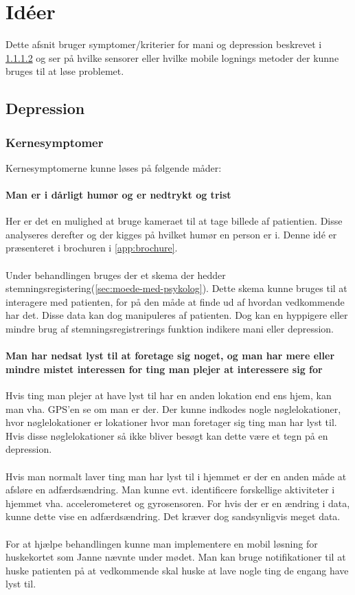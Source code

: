 \section{Idéer}
Dette afsnit bruger symptomer/kriterier for mani og depression beskrevet i \cref{} og ser på hvilke sensorer eller hvilke mobile lognings metoder der kunne bruges til at løse problemet.

\subsection{Depression}

\subsubsection{Kernesymptomer}
Kernesymptomerne kunne løses på følgende måder:

\paragraph{Man er i dårligt humør og er nedtrykt og trist}
Her er det en mulighed at bruge kameraet til at tage billede af patientien. Disse analyseres derefter og der kigges på hvilket humør en person er i. Denne idé er præsenteret i brochuren i \cref{app:brochure}.
\\
\\
Under behandlingen bruges der et skema der hedder stemningsregistering(\cref{sec:moede-med-psykolog}). Dette skema kunne bruges til at interagere med patienten, for på den måde at finde ud af hvordan vedkommende har det. Disse data kan dog manipuleres af patienten. Dog kan en hyppigere eller mindre brug af stemningsregistrerings funktion indikere mani eller depression.
\paragraph{Man har nedsat lyst til at foretage sig noget, og man har mere eller mindre mistet interessen for ting man plejer at interessere sig for}
Hvis ting man plejer at have lyst til har en anden lokation end ens hjem, kan man vha. GPS'en se om man er der. Der kunne indkodes nogle nøglelokationer, hvor nøglelokationer er lokationer hvor man foretager sig ting man har lyst til.
Hvis disse nøglelokationer så ikke bliver besøgt kan dette være et tegn på en depression.
\\
\\
Hvis man normalt laver ting man har lyst til i hjemmet er der en anden måde at afsløre en adfærdsændring. Man kunne evt. identificere forskellige aktiviteter i hjemmet vha. accelerometeret og gyrosensoren. For hvis der er en ændring i data, kunne dette vise en adfærdsændring. Det kræver dog sandsynligvis meget data.
\\
\\
For at hjælpe behandlingen kunne man implementere en mobil løsning for huskekortet som Janne nævnte under mødet. Man kan bruge notifikationer til at huske patienten på at vedkommende skal huske at lave nogle ting de engang have lyst til.

